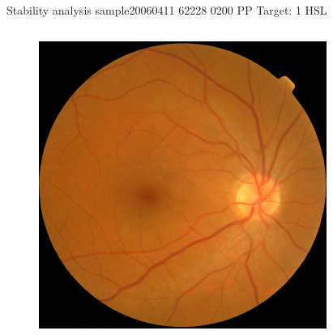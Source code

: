 \documentclass{beamer}
\begin{document}
\begin{frame}{Stability analysis sample}{20060411 62228 0200 PP Target: 1 HSL}
\begin{columns}
	\begin{column}{0.3\textwidth}
		\begin{figure}[p]
			\centering
			\includegraphics[width=\textwidth]{chapter_stability/20060411_62228_0200_PP/20060411_62228_0200_PP.jpeg}
		\end{figure}	
	\end{column}
	\begin{column}{0.45\textwidth}  %
		\begin{figure}[p]
			\centering

\end{figure}
\end{column}
\end{columns}
\end{frame}
\end{document}
